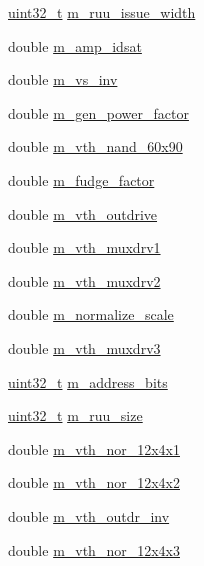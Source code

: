 \begin{DoxyCompactItemize}
\item 
\hyperlink{Type_8hh_a435d1572bf3f880d55459d9805097f62}{uint32\_\-t} \hyperlink{classTechParameter_a61884d91cb2418ae79c6f2971329ec35}{m\_\-ruu\_\-issue\_\-width}
\item 
double \hyperlink{classTechParameter_a0de4e18c31d8dc364ffc1b6d1ce4a289}{m\_\-amp\_\-idsat}
\item 
double \hyperlink{classTechParameter_a22870fdbc093e1f8a42fd98f552a7ce8}{m\_\-vs\_\-inv}
\item 
double \hyperlink{classTechParameter_a8280fcc2d05c5182d5db531044cfe9fd}{m\_\-gen\_\-power\_\-factor}
\item 
double \hyperlink{classTechParameter_a40ea835c636fb6a9f3b3ebd52edb90cb}{m\_\-vth\_\-nand\_\-60x90}
\item 
double \hyperlink{classTechParameter_a242023d696ca6315600461ee4c1103b2}{m\_\-fudge\_\-factor}
\item 
double \hyperlink{classTechParameter_ad2b12d3a1961a88627ff4692748755e9}{m\_\-vth\_\-outdrive}
\item 
double \hyperlink{classTechParameter_af1a8415f67a510ad31a692373616a5d0}{m\_\-vth\_\-muxdrv1}
\item 
double \hyperlink{classTechParameter_a8f72e1f501d3d61f49842c47495ad449}{m\_\-vth\_\-muxdrv2}
\item 
double \hyperlink{classTechParameter_a51ac2ccdc191c0753211370db75c5d23}{m\_\-normalize\_\-scale}
\item 
double \hyperlink{classTechParameter_aa9228d7eb4333e4cb55ebcfa8fe4d6de}{m\_\-vth\_\-muxdrv3}
\item 
\hyperlink{Type_8hh_a435d1572bf3f880d55459d9805097f62}{uint32\_\-t} \hyperlink{classTechParameter_a5fee5042d346000013597e0fba415b07}{m\_\-address\_\-bits}
\item 
\hyperlink{Type_8hh_a435d1572bf3f880d55459d9805097f62}{uint32\_\-t} \hyperlink{classTechParameter_a2158a527bfe632fd2ead720d48ab8fa2}{m\_\-ruu\_\-size}
\item 
double \hyperlink{classTechParameter_aa2d861d57d1c41a1854c8d67d723d615}{m\_\-vth\_\-nor\_\-12x4x1}
\item 
double \hyperlink{classTechParameter_a81d52c7750e0b73412a64f7c8f23e994}{m\_\-vth\_\-nor\_\-12x4x2}
\item 
double \hyperlink{classTechParameter_a5f729a0e93f9d6fb52222146a1ef2a17}{m\_\-vth\_\-outdr\_\-inv}
\item 
double \hyperlink{classTechParameter_ac8ce54905ca5ed1bd4241bc3a9e42c7d}{m\_\-vth\_\-nor\_\-12x4x3}

\end{DoxyCompactItemize}
